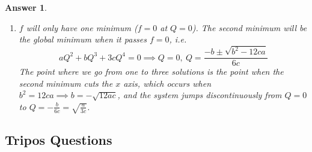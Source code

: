 \documentclass[a4paper]{article}
\DeclareMathOperator{\Tr}{Tr}
\newtheorem{ans}{Answer}[section]
\theoremstyle{new}
\begin{document}
\begin{ans}
\begin{enumerate}[label=(\alph*)]
\begin{align}
\end{align}
So the free energy is
$$f=a\Tr(S\cdot S)+b\Tr(S\cdot S\cdot S)+c\Tr(S\cdot S\cdot S\cdot S)=6aQ^2+6bQ^3+18cQ^4$$
If $b=0$, this is a simple symmetric energy with a single minimum. As $b$ is reduced below 0, the energy loses symmetry, and eventually a second minimum appears at positive $Q$. At some value of $b$, it becomes the global minimum. The transition is thus discontinuous.
\item $f$ will only have one minimum ($f=0$ at $Q=0$). The second minimum will be the global minimum when it passes $f=0$, i.e.
$$aQ^2+bQ^3+3cQ^4=0\implies Q=0,~Q=\frac{-b\pm\sqrt{b^2-12ca}}{6c}$$
The point where we go from one to three solutions is the point when the second minimum cuts the $x$ axis, which occurs when $b^2=12ca\implies b=-\sqrt{12ac}$, and the system jumps discontinuously from $Q=0$ to $Q=-\frac{b}{6c}=\sqrt{\frac{a}{3c}}$.
\end{enumerate}
\end{ans}
\newpage
\subsection{Tripos Questions}
\end{document}
